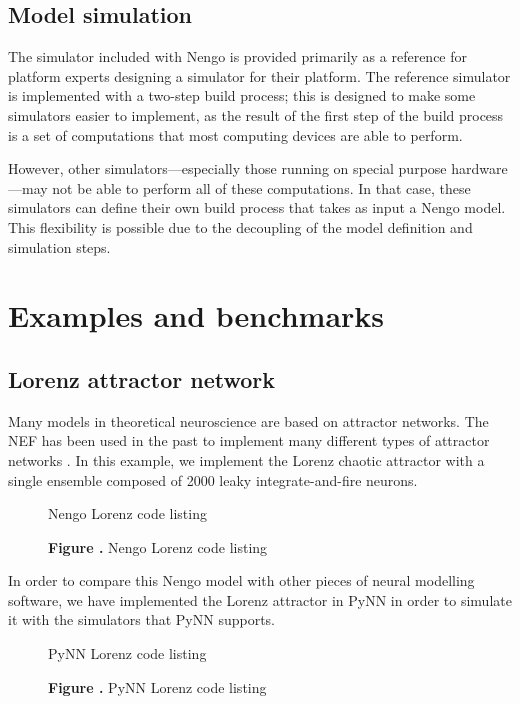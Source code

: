 \documentclass{frontiersSCNS}
\begin{document}
\subsection{Model simulation}

The simulator included with Nengo
is provided primarily as a reference
for platform experts designing a simulator
for their platform.
The reference simulator is implemented with
a two-step build process;
this is designed to make
some simulators easier to implement,
as the result of
the first step of the build process
is a set of computations
that most computing devices are able to perform.

However, other simulators---especially
those running on special purpose
hardware---may not be able
to perform all of these computations.
In that case, these simulators
can define their own build process
that takes as input a Nengo model.
This flexibility is possible
due to the decoupling of
the model definition and simulation steps.

\section{Examples and benchmarks}

\subsection{Lorenz attractor network}

Many models in theoretical neuroscience
are based on attractor networks.
The NEF has been used in the past
to implement many different types of
attractor networks \cite{TODO}.
In this example,
we implement the Lorenz chaotic attractor
with a single ensemble
composed of 2000 leaky integrate-and-fire neurons.

\begin{figure}
\begin{center}
  Nengo Lorenz code listing
\end{center}
 \textbf{\label{fig:01} Figure .}{
   Nengo Lorenz code listing}
\end{figure}

In order to compare this Nengo model
with other pieces of neural modelling software,
we have implemented the Lorenz attractor
in PyNN \cite{TODO} in order to simulate it
with the simulators that PyNN supports.

\begin{figure}
\begin{center}
  PyNN Lorenz code listing
\end{center}
 \textbf{\label{fig:01} Figure .}{
   PyNN Lorenz code listing}
\end{figure}
\end{document}
